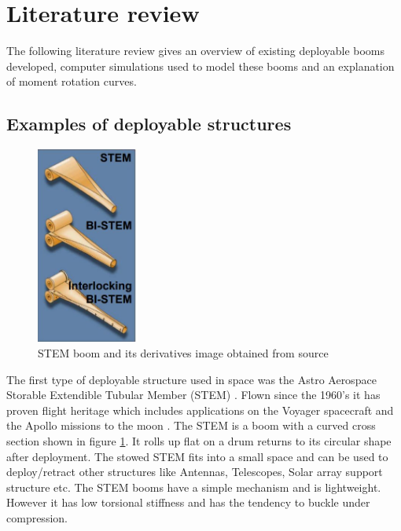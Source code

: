 \section{Literature review}
\label{sec:litreview}
The following literature review gives an overview of existing deployable booms developed, computer simulations used to model these booms and an explanation of moment rotation curves. 
\subsection{Examples of deployable structures}
\begin{figure}
  \begin{center}
     \includegraphics[width=0.3\textwidth]{images/stemderivatives.JPG}
  \end{center}
  \caption{STEM boom and its derivatives image obtained from source \cite{NorthropGrumman}}
  \label{fig:boom}
\end{figure}
The first type of deployable structure used in space was the Astro Aerospace Storable Extendible Tubular Member (STEM) \cite{NorthropGrumman}. Flown since the 1960's it has proven flight heritage which includes applications on the Voyager spacecraft and the Apollo missions to the moon \cite{NorthropGrumman}. The STEM is a boom with a curved cross section shown in figure \ref{fig:boom}. It rolls up flat on a drum returns to its circular shape after deployment\cite{NorthropGrumman}. The stowed STEM fits into a small space and can be used to deploy/retract other structures like Antennas, Telescopes, Solar array support structure etc. The STEM booms have a simple mechanism and is lightweight. However it has low torsional stiffness and has the tendency to buckle under compression. 
